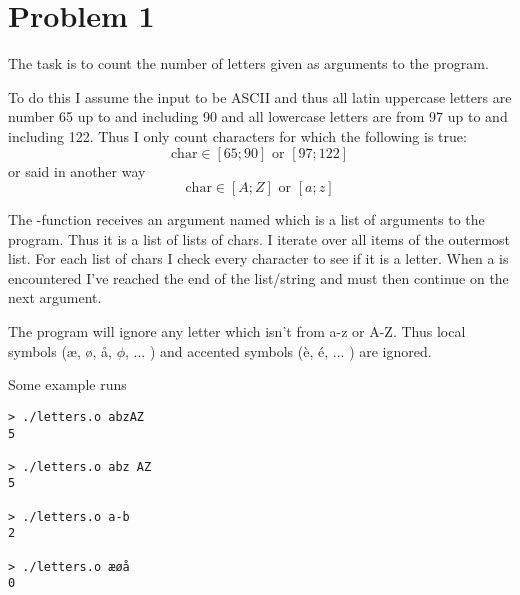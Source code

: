 \section*{Problem 1}

The task is to count the number of letters given as arguments to the program.

To do this I assume the input to be ASCII and thus all latin uppercase letters
are number 65 up to and including 90 and all lowercase letters are from 97 up
to and including 122. Thus I only count characters for which the following is
true:
$$ \text{char} \in [65;90] \text{ or } [97;122] $$
or said in another way
$$ \text{char} \in [A;Z] \text{ or } [a;z] $$

The -function receives an argument named  which is a
list of arguments to the program. Thus it is a list of lists of chars. I
iterate over all items of the outermost list. For each list of chars I check
every character to see if it is a letter. When a  is encountered
I've reached the end of the list/string and must then continue on the next
argument.

The program will ignore any letter which isn't from a-z or A-Z. Thus local
symbols (æ, ø, å, $\phi$, ... ) and accented symbols (è, é, ... ) are ignored.

Some example runs

\begin{verbatim}
> ./letters.o abzAZ
5

> ./letters.o abz AZ
5

> ./letters.o a-b
2

> ./letters.o æøå
0
\end{verbatim}
